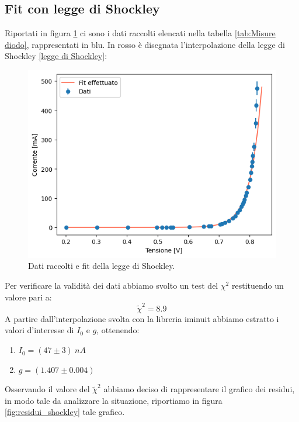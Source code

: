 \documentclass[letterpaper,12pt]{article}
\begin{document}
\subsection{Fit con legge di Shockley}
Riportati in figura \ref{fig:Dati raccolti e fit lineare Shockley} ci sono i dati raccolti elencati nella tabella \ref{tab:Misure diodo}, rappresentati in blu. In rosso è disegnata l'interpolazione della legge di Shockley \ref{legge di Shockley}: 
\begin{figure}[h!]
    \centering
    \includegraphics[width=.8\textwidth]{legge_shockley.png}
    \caption{Dati raccolti e fit della legge di Shockley.}
    \label{fig:Dati raccolti e fit lineare Shockley}
\end{figure}
Per verificare la validità dei dati abbiamo svolto un test del $\chi^{2}$ restituendo un valore pari a: $$\widetilde{\chi}^2= 8.9$$ 
A partire dall'interpolazione svolta con la libreria iminuit abbiamo estratto i valori d'interesse di $I_0$ e $g$, ottenendo:
\begin{enumerate}
    \item $I_0 = (47\pm3)\ nA$
    \item $g = (1.407\pm0.004)$
\end{enumerate}
Osservando il valore del $\widetilde{\chi}^2$ abbiamo deciso di rappresentare il grafico dei residui, in modo tale da analizzare la situazione, riportiamo in figura \ref{fig:residui_shockley} tale grafico.
\end{document}
